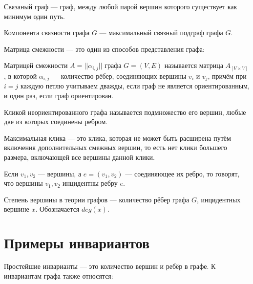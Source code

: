 \begin{my_def}
Связаный граф --- граф, между любой парой вершин которого существует как
минимум один путь.
\end{my_def}

\begin{my_def}
Компонента связности графа  $G$ --- максимальный связный подграф графа  $G$.
\end{my_def}

Матрица смежности --- это один из способов представления графа:

\begin{my_def}
Матрицей смежности $A=||\alpha_{i,j}||$ графа $G=(V,E)$ называется матрица $A_{[V\times{}V]}$, в которой $\alpha_{i,j}$ --- количество рёбер,
соединяющих вершины $v_i$ и $v_j$, причём при $i=j$ каждую петлю учитываем дважды,
если граф не является ориентированным, и один раз, если граф ориентирован.
\end{my_def}

\begin{my_def}
Кликой неориентированного графа называется подмножество его вершин, любые две из
которых соединены ребром.

Максимальная клика --- это клика, которая не может быть
расширена путём включения дополнительных смежных вершин, то есть нет клики большего
размера, включающей все вершины данной клики.
\end{my_def}

\begin{my_def}
Если $v_{1}, v_{2}$ --- вершины, а  $e=(v_{1},v_{2})$ --- соединяющее их ребро, то
говорят, что вершины $v_{1}, v_{2}$ инцидентны ребру $e$.
\end{my_def}

\begin{my_def}
Степень вершины в теории графов --- количество рёбер графа $G$, инцидентных вершине $x$.
Обозначается $deg(x)$.
\end{my_def}


\section{Примеры инвариантов}

Простейшие инварианты --- это количество вершин и ребёр в графе. К инвариантам
графа также относятся:

